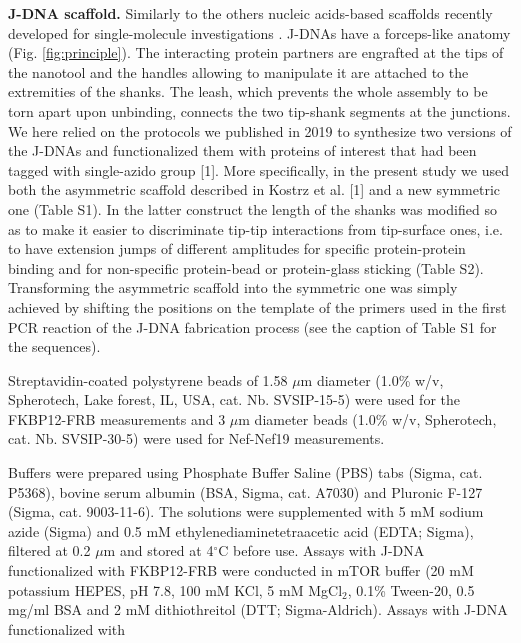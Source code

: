 \documentclass{biophys-new}
\begin{document}
\noindent
\textbf{J-DNA scaffold.} Similarly to the others nucleic acids-based scaffolds recently developed for single-molecule investigations \cite{kostrz2019, yang2016,halvorsen2011, penth2021, li2019, ma2019, mickolajczyk2022, shrestha2021, kilchherr2016}. J-DNAs have a forceps-like anatomy \cite{gosse2019} (Fig. \ref{fig:principle}). The interacting protein partners are engrafted at the tips of the nanotool and the handles allowing to manipulate it are attached to the extremities of the shanks. The leash, which prevents the whole assembly to be torn apart upon unbinding, connects the two tip-shank segments at the junctions. We here relied on the protocols we published in 2019 to synthesize two versions of the J-DNAs and functionalized them with proteins of interest that had been tagged with single-azido group [1]. More specifically, in the present study we used both the asymmetric scaffold described in Kostrz et al. [1] and a new symmetric one (Table S1). In the latter construct the length of the shanks was modified so as to make it easier to discriminate tip-tip interactions from tip-surface ones, i.e. to have extension jumps of different amplitudes for specific protein-protein binding and for non-specific protein-bead or protein-glass sticking (Table S2). Transforming the asymmetric scaffold into the symmetric one was simply achieved by shifting the positions on the template of the primers used in the first PCR reaction of the J-DNA fabrication process (see the caption of Table S1 for the sequences). 

Streptavidin-coated polystyrene beads of 1.58 $\mu$m diameter (1.0\% w/v, Spherotech,  Lake forest, IL, USA, cat. Nb. SVSIP-15-5) were used for the FKBP12-FRB measurements and 3 $\mu$m diameter beads (1.0\% w/v, Spherotech, cat. Nb. SVSIP-30-5) were used for Nef-Nef19 measurements.%

Buffers were prepared using Phosphate Buffer Saline (PBS) tabs (Sigma, cat. P5368), bovine serum albumin (BSA, Sigma, cat. A7030) and Pluronic F-127 (Sigma, cat. 9003-11-6). The solutions were supplemented with 5 mM sodium azide (Sigma) and 0.5  mM  ethylenediaminetetraacetic acid (EDTA;  Sigma), filtered at 0.2 $\mu$m and stored at 4$^{\circ}$C before use.
Assays with J-DNA functionalized with FKBP12-FRB were conducted in mTOR buffer (20 mM potassium HEPES, pH 7.8, 100 mM KCl, 5 mM MgCl$_2$, 0.1\% Tween-20, 0.5 mg/ml BSA and 2 mM dithiothreitol (DTT; Sigma-Aldrich).
Assays with J-DNA functionalized with
\end{document}
